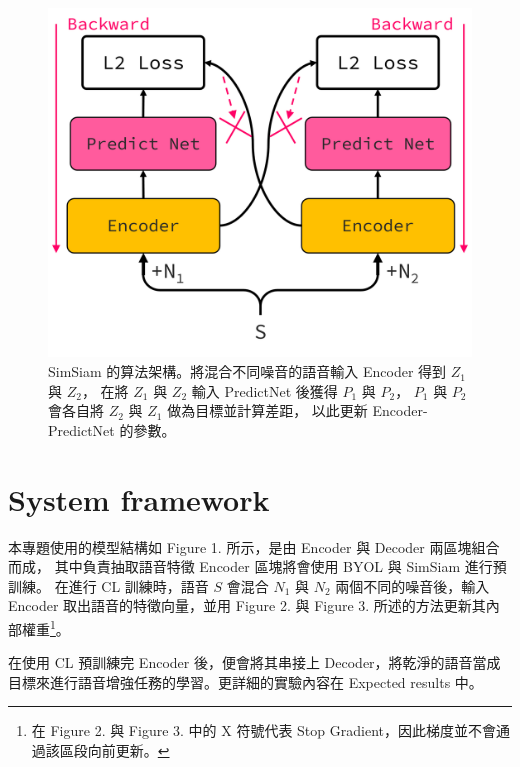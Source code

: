 \documentclass[10pt,twocolumn,letterpaper]{article}
\begin{document}
\begin{CJK}{UTF8}{bkai}
   \begin{figure}[t]
      \begin{center}
         \includegraphics[width=1\linewidth]{img/SimSiam.png}
      \end{center}
      \caption{
         SimSiam 的算法架構。將混合不同噪音的語音輸入 Encoder 得到 $Z_1$ 與 $Z_2$，
         在將 $Z_1$ 與 $Z_2$ 輸入 PredictNet 後獲得 $P_1$ 與 $P_2$，
         $P_1$ 與 $P_2$ 會各自將 $Z_2$ 與 $Z_1$ 做為目標並計算差距，
         以此更新 Encoder-PredictNet 的參數。
      }
      \label{fig:long}
      \label{fig:onecol}
   \end{figure}
   \section{System framework}
   本專題使用的模型結構如 Figure 1. 所示，是由 Encoder 與 Decoder 兩區塊組合而成，
   其中負責抽取語音特徵 Encoder 區塊將會使用 BYOL 與 SimSiam 進行預訓練。
   在進行 CL 訓練時，語音 $S$ 會混合 $N_1$ 與 $N_2$ 兩個不同的噪音後，輸入 Encoder
   取出語音的特徵向量，並用 Figure 2. 與 Figure 3. 所述的方法更新其內部權重\footnote{
      在 Figure 2. 與 Figure 3. 中的 X 符號代表 Stop Gradient，因此梯度並不會通過該區段向前更新。}。

   在使用 CL 預訓練完 Encoder 後，便會將其串接上
   Decoder，將乾淨的語音當成目標來進行語音增強任務的學習。更詳細的實驗內容在 Expected results 中。



\end{CJK}
\end{document}
